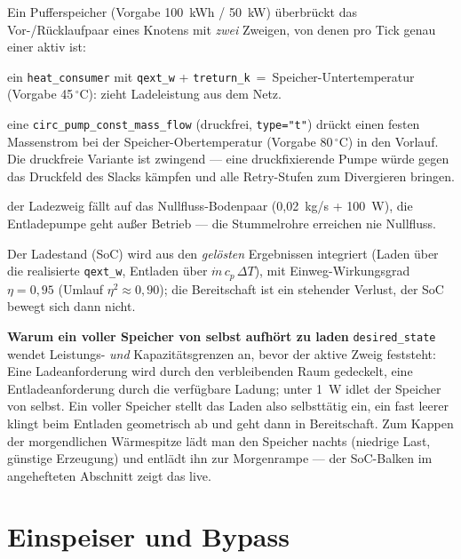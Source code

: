 \documentclass[11pt,a4paper,parskip=half]{scrreprt}
\newcommand{\gC}{\,\ensuremath{{}^{\circ}\mathrm{C}}}
\newenvironment{beispiel}[1][Beispiel]
  {\par\medskip{\color{bsp}\hrule height 0.8pt}\nopagebreak\smallskip
   \noindent\textbf{\textsf{\textcolor{bsp}{#1}}}\quad\ignorespaces}
  {\par\nopagebreak\smallskip{\color{bsp}\hrule height 0.8pt}\par\medskip}
\begin{document}
Ein Pufferspeicher (Vorgabe 100~kWh / 50~kW) überbrückt das Vor-/Rücklaufpaar
eines Knotens mit \emph{zwei} Zweigen, von denen pro Tick genau einer aktiv ist:

\begin{description}[nosep]
  \item[Laden] ein \texttt{heat\_consumer} mit \texttt{qext\_w} +
    \texttt{treturn\_k}~=~Speicher-Untertemperatur (Vorgabe 45\gC): zieht
    Ladeleistung aus dem Netz.
  \item[Entladen] eine \texttt{circ\_pump\_const\_mass\_flow} (druckfrei,
    \texttt{type="t"}) drückt einen festen Massenstrom bei der
    Speicher-Obertemperatur (Vorgabe 80\gC) in den Vorlauf. Die druckfreie
    Variante ist zwingend --- eine druckfixierende Pumpe würde gegen das
    Druckfeld des Slacks kämpfen und alle Retry-Stufen zum Divergieren bringen.
  \item[Bereitschaft] der Ladezweig fällt auf das Nullfluss-Bodenpaar
    (0{,}02~kg/s + 100~W), die Entladepumpe geht außer Betrieb --- die
    Stummelrohre erreichen nie Nullfluss.
\end{description}

Der Ladestand (SoC) wird aus den \emph{gelösten} Ergebnissen integriert (Laden
über die realisierte \texttt{qext\_w}, Entladen über $\dot m\,c_p\,\Delta T$),
mit Einweg-Wirkungsgrad $\eta=0{,}95$ (Umlauf $\eta^2\approx0{,}90$); die
Bereitschaft ist ein stehender Verlust, der SoC bewegt sich dann nicht.

\begin{beispiel}[Warum ein voller Speicher von selbst aufhört zu laden]
\texttt{desired\_state} wendet Leistungs- \emph{und} Kapazitätsgrenzen an,
bevor der aktive Zweig feststeht: Eine Ladeanforderung wird durch den
verbleibenden Raum gedeckelt, eine Entladeanforderung durch die verfügbare
Ladung; unter 1~W idlet der Speicher von selbst. Ein voller Speicher stellt das
Laden also selbsttätig ein, ein fast leerer klingt beim Entladen geometrisch ab
und geht dann in Bereitschaft. Zum Kappen der morgendlichen Wärmespitze lädt man
den Speicher nachts (niedrige Last, günstige Erzeugung) und entlädt ihn zur
Morgenrampe --- der SoC-Balken im angehefteten Abschnitt zeigt das live.
\end{beispiel}

\section{Einspeiser und Bypass}
\end{document}
